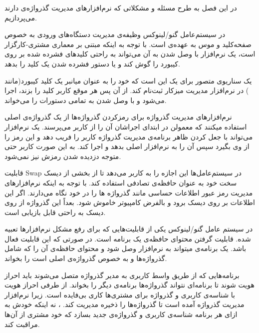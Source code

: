 
در این فصل به طرح مسئله و مشکلاتی که نرم‌‌افزارهای مدیریت گذرواژه‌ی دارند می‌پردازیم.


در سیستم‌عامل گنو/لینوکس وظیفه‌ی مدیریت دستگاه‌های ورودی به خصوص صفحه‌کلید و موس به عهده‌ی  است. با توجه به اینکه  مبتنی بر معماری مشتری-کارگزار است، یک نرم‌افزار با وصل شدن به آن می‌تواند به راحتی کلید‌های فشرده شده بر روی کیبورد را گوش کند و یا دستور فشرده شدن یک کلید را بدهد. 

یک سناریوی متصور برای یک  این است که خود را به عنوان میانبر یک کلید کیبورد(مانند ) در نرم‌افزار مدیریت میزکار ثبت‌نام کند. از آن پس هر موقع کاربر کلید  را بزند،  اجرا می‌شود و با وصل شدن به  تمامی دستورات را می‌خواند.


نرم‌افزارهای مدیریت گذرواژه برای رمزکردن گذرواژه‌ها از یک گذرواژه‌ی اصلی استفاده میکنند که معمولن در ابتدای اجراشان آن را از کاربر می‌پرسند. یک نرم‌افزار می‌تواند با جعل کردن ظاهر برنامه‌ی مدیریت گذرواژه کاربر را فریب دهد و این رمز را از وی بگیرد سپس آن را به نرم‌افزار اصلی بدهد و اجرا کند. به این صورت کاربر حتی متوجه دزدیده شدن رمزش نیز نمی‌شود.


قابلیت Swap در سیستم‌عامل‌ها این اجازه را به کاربر می‌دهد تا از بخشی از دیسک سخت خود به عنوان حافظه‌ی تصادفی استفاده کند. با توجه به اینکه نرم‌افزارهای مدیریت رمز عبور اطلاعات حساسی مانند گذرواژه ها را در خود نگاه می‌دارند. اگر این اطلاعات بر روی دیسک برود و بالفرض کامپیوتر خاموش شود. بعداً این گذرواژه از روی دیسک به راحتی قابل بازیابی است.


در سیستم عامل گنو/لینوکس یکی از قابلیت‌هایی که برای رفع مشکل نرم‌افزارها تعبیه شده. قابلیت گرفتن محتوای حافظه‌ی یک برنامه است. در صورتی که این قابلیت فعال باشد. یک برنامه‌ی  میتواند به نرم‌افزار وصل شود و محتوای حافظه‌ی آن را که شامل گذرواژه‌ها و به خصوص گذرواژه‌ی اصلی است را بخواند.


برنامه‌هایی که از طریق واسط کاربری به مدیر گذرواژه متصل می‌شوند باید احراز هویت شوند تا برنامه‌ای نتواند گذرواژه‌ها برنامه‌ی دیگر را بخواند. از طرفی احراز هویت با شناسه‌ی کاربری و گذرواژه برای مشتری‌ها کاری بی‌فایده است. زیرا نرم‌افزار مدیریت گذرواژه آمده است تا گذرواژه‌ها را ذخیره مدیریت کند. ، نه اینکه خودش به ازای هر برنامه شناسه‌ی کاربری و گذرواژه‌ی جدید بسازد که خود مشتری از آن‌ها مراقبت کند. 


